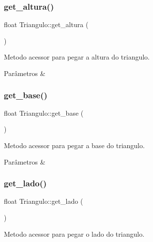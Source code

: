 \subsubsection{\texorpdfstring{get\+\_\+altura()}{get\_altura()}}
{\footnotesize\ttfamily float Triangulo\+::get\+\_\+altura (\begin{DoxyParamCaption}{ }\end{DoxyParamCaption})}



Metodo acessor para pegar a altura do triangulo. 


\begin{DoxyParams}{Parâmetros}
{\em } & \\
\hline
\end{DoxyParams}
\mbox{\label{classTriangulo_a1f5be10a4be1573deb30a2c3183854cc}} 
\subsubsection{\texorpdfstring{get\+\_\+base()}{get\_base()}}
{\footnotesize\ttfamily float Triangulo\+::get\+\_\+base (\begin{DoxyParamCaption}{ }\end{DoxyParamCaption})}



Metodo acessor para pegar a base do triangulo. 


\begin{DoxyParams}{Parâmetros}
{\em } & \\
\hline
\end{DoxyParams}
\mbox{\label{classTriangulo_ab3004c72c6d231a0aec6178e17ab7d19}} 
\subsubsection{\texorpdfstring{get\+\_\+lado()}{get\_lado()}}
{\footnotesize\ttfamily float Triangulo\+::get\+\_\+lado (\begin{DoxyParamCaption}{ }\end{DoxyParamCaption})}



Metodo acessor para pegar o lado do triangulo. 



